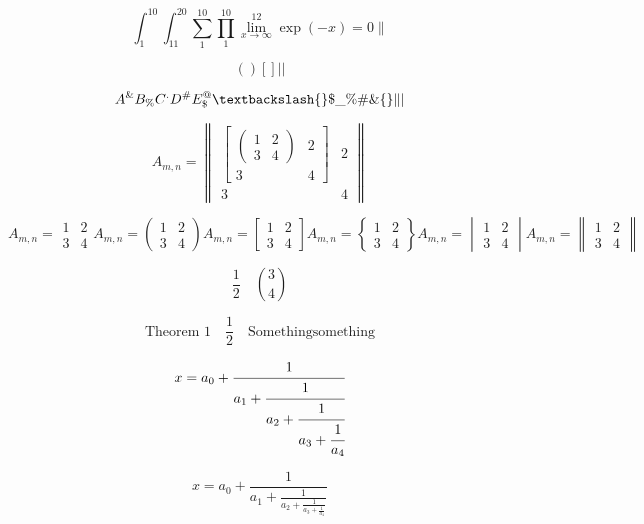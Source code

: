\documentclass[a4paper,12pt]{article}
\begin{document}
$$ 
\int^{10}_1 \int_{11}^{20} \sum^{10}_{1} \prod_{1}^{10} \lim_{x \to \infty}^{12} \exp(-x) = 0 \|
$$

$$
\left( \right) \left[ \right] \left| \right|
$$

$$
A^\& B_\% C^. D^\# E_\$^@ \textbackslash \lbrace \rbrace \$ \_ \% \# \& \{ \}  \| |
$$

$$
A_{m,n} = \begin{Vmatrix} \begin{bmatrix} \begin{pmatrix} 1 & 2 \\ 3 & 4 \end{pmatrix} & 2 \\ 3 & 4 \end{bmatrix} & 2 \\ 3 & 4 \end{Vmatrix}
$$

$$
A_{m,n} = \begin{matrix} 1 & 2 \\ 3 & 4 \end{matrix}
A_{m,n} = \begin{pmatrix} 1 & 2 \\ 3 & 4 \end{pmatrix}
A_{m,n} = \begin{bmatrix} 1 & 2 \\ 3 & 4 \end{bmatrix}
A_{m,n} = \begin{Bmatrix} 1 & 2 \\ 3 & 4 \end{Bmatrix}
A_{m,n} = \begin{vmatrix} 1 & 2 \\ 3 & 4 \end{vmatrix}
A_{m,n} = \begin{Vmatrix} 1 & 2 \\ 3 & 4 \end{Vmatrix}
$$

$$
\frac12 \quad \binom34
$$

$$
\text{Theorem 1} \quad \frac12 \quad \mathrm{Something something}
$$

$$
  x = a_0 + \cfrac{1}{a_1
          + \cfrac{1}{a_2
          + \cfrac{1}{a_3 + \cfrac{1}{a_4} } } }
$$

$$
  x = a_0 + \frac{1}{a_1
          + \frac{1}{a_2
          + \frac{1}{a_3 + \frac{1}{a_4} } } }
$$
\end{document}

